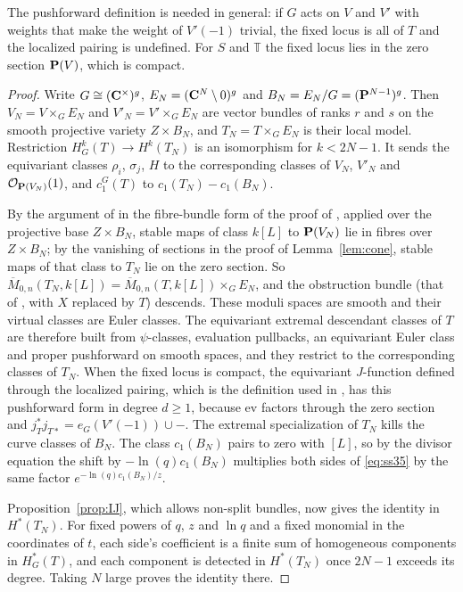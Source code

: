 The pushforward definition is needed in general: if \(G\) acts on \(V\) and
\(V'\) with weights that make the weight of \(V'(-1)\) trivial, the fixed
locus is all of \(T\) and the localized pairing is undefined.  For \(S\) and
\(\mathbb T\) the fixed locus lies in the zero section \(\mathbf P(V)\), which is
compact.

\begin{proof}
  Write \(G\cong(\mathbf C^{\times})^{g}\), \(E_{N}=(\mathbf C^{N}\setminus0)^{g}\) and
  \(B_{N}=E_{N}/G=(\mathbf P^{N-1})^{g}\).  Then \(V_{N}=V\times_{G}E_{N}\) and
  \(V'_{N}=V'\times_{G}E_{N}\) are vector bundles of ranks \(r\) and \(s\) on
  the smooth projective variety \(Z\times B_{N}\), and
  \(T_{N}=T\times_{G}E_{N}\) is their local model.  Restriction
  \(H^{k}_{G}(T)\to H^{k}(T_{N})\) is an isomorphism for \(k<2N-1\).  It sends
  the equivariant classes \(\rho_{i}\), \(\sigma_{j}\), \(H\) to the
  corresponding classes of \(V_{N}\), \(V'_{N}\) and \(\mathcal
  O_{\mathbf P(V_{N})}(1)\), and \(c^{G}_{1}(T)\) to
  \(c_{1}(T_{N})-c_{1}(B_{N})\).

  By the argument of \cite[Lemma~2.6]{SS} in the fibre-bundle form of the
  proof of \cite[Theorem~4.2]{SS}, applied over the projective base
  \(Z\times B_{N}\), stable maps of class \(k[L]\) to \(\mathbf P(V_{N})\) lie in
  fibres over \(Z\times B_{N}\); by the vanishing of sections in the proof of
  Lemma~\ref{lem:cone}, stable maps of that class to \(T_{N}\) lie on the
  zero section.  So
  \(\overline M_{0,n}(T_{N},k[L])=\overline M_{0,n}(T,k[L])\times_{G}E_{N}\),
  and the obstruction bundle (that of \cite[Corollary~3.2]{SS}, with \(X\)
  replaced by \(T\)) descends.  These
  moduli spaces are smooth and their virtual classes are Euler classes.  The
  equivariant extremal descendant classes of \(T\) are therefore built from
  \(\psi\)-classes, evaluation pullbacks, an equivariant Euler class and
  proper pushforward on smooth spaces, and they restrict to the corresponding
  classes of \(T_{N}\).  When the fixed locus is compact, the equivariant
  \(J\)-function defined through the localized pairing, which is the
  definition used in \cite{SS}, has this pushforward form in degree
  \(d\ge1\), because \(\mathrm{ev}\) factors through the zero section and
  \(j_{T}^{*}j_{T*}=e_{G}(V'(-1))\cup-\).  The extremal specialization of
  \(T_{N}\) kills the curve classes of \(B_{N}\).  The class \(c_{1}(B_{N})\)
  pairs to zero with \([L]\), so by the divisor equation the shift by
  \(-\ln(q)c_{1}(B_{N})\) multiplies both sides of \eqref{eq:ss35} by the same
  factor \(e^{-\ln(q)c_{1}(B_{N})/z}\).

  Proposition~\ref{prop:IJ}, which allows non-split bundles, now gives the
  identity in \(H^{*}(T_{N})\).  For fixed powers of \(q\), \(z\) and
  \(\ln q\) and a fixed monomial in the coordinates of \(t\), each side's
  coefficient is a finite sum of homogeneous components in
  \(H^{*}_{G}(T)\), and each component is detected in \(H^{*}(T_{N})\) once
  \(2N-1\) exceeds its degree.  Taking \(N\) large proves the identity there.
\end{proof}

